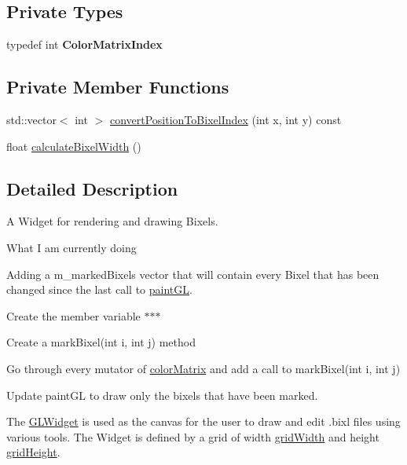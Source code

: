 \subsection*{Private Types}
\begin{DoxyCompactItemize}
\item 
\hypertarget{classGLWidget_a5a2947849a31320f39477d93511712e5}{typedef int {\bfseries Color\-Matrix\-Index}}\label{classGLWidget_a5a2947849a31320f39477d93511712e5}

\end{DoxyCompactItemize}
\subsection*{Private Member Functions}
\begin{DoxyCompactItemize}
\item 
std\-::vector$<$ int $>$ \hyperlink{classGLWidget_a7555011afa685031ca05eaebe7d673cc}{convert\-Position\-To\-Bixel\-Index} (int x, int y) const 
\item 
float \hyperlink{classGLWidget_a9e1d6025155e0e95331f3dd8a8a4db62}{calculate\-Bixel\-Width} ()
\end{DoxyCompactItemize}


\subsection{Detailed Description}
A Widget for rendering and drawing Bixels. 

\begin{DoxyRefDesc}{What I am currently doing}
\item[\hyperlink{task__task000001}{What I am currently doing}]Adding a m\-\_\-marked\-Bixels vector that will contain every Bixel that has been changed since the last call to \hyperlink{classGLWidget_a640b5570cb2b37724fd5b58a77339c5e}{paint\-G\-L}.
\begin{DoxyItemize}
\item Create the member variable $\ast$$\ast$$\ast$
\item Create a mark\-Bixel(int i, int j) method
\item Go through every mutator of \hyperlink{classGLWidget_aab1b8762be4b33d384e3689427c2addc}{color\-Matrix} and add a call to mark\-Bixel(int i, int j)
\item Update paint\-G\-L to draw only the bixels that have been marked. 
\end{DoxyItemize}\end{DoxyRefDesc}
The \hyperlink{classGLWidget}{G\-L\-Widget} is used as the canvas for the user to draw and edit .bixl files using various tools. The Widget is defined by a grid of width \hyperlink{classGLWidget_a272046b9cb9f26f5b382f9a121672570}{grid\-Width} and height \hyperlink{classGLWidget_a419c32eef067d7157b00904dd52bdb8b}{grid\-Height}.

